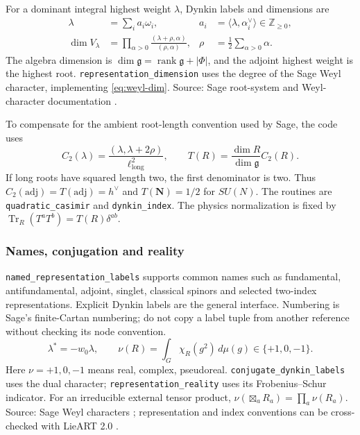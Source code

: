 \documentclass[11pt,a4paper]{article}
\numberwithin{equation}{section}
\newcommand{\code}[1]{{\small\nolinkurl{#1}}}
\newcommand{\Tr}{\operatorname{Tr}}
\newcommand{\rank}{\operatorname{rank}}
\newcommand{\adj}{\mathrm{adj}}
\newcommand{\ZZ}{\mathbb Z}
\newcommand{\src}[1]{{\small\color{muted}Source: #1.}\par}
\begin{document}
For a dominant integral highest weight $\lambda$, Dynkin labels and dimensions are
\begin{align}
 \lambda&=\sum_i a_i\omega_i,&
 a_i&=\langle\lambda,\alpha_i^\vee\rangle\in\ZZ_{\geq0},\label{eq:dynkin}\\
 \dim V_\lambda&=\prod_{\alpha>0}
 \frac{(\lambda+\rho,\alpha)}{(\rho,\alpha)},&
 \rho&=\frac12\sum_{\alpha>0}\alpha.\label{eq:weyl-dim}
\end{align}
The algebra dimension is $\dim\mathfrak g=\rank\mathfrak g+|\Phi|$, and the
adjoint highest weight is the highest root. \code{representation_dimension}
uses the degree of the Sage Weyl character, implementing \eqref{eq:weyl-dim}.
\src{Sage root-system and Weyl-character documentation \cite{sage-roots,sage-chars}}

To compensate for the ambient root-length convention used by Sage, the code uses
\begin{equation}
 C_2(\lambda)=\frac{(\lambda,\lambda+2\rho)}{\ell_{\mathrm{long}}^2},
 \qquad T(R)=\frac{\dim R}{\dim\mathfrak g}C_2(R).
 \label{eq:casimir}
\end{equation}
If long roots have squared length two, the first denominator is two. Thus
$C_2(\adj)=T(\adj)=h^\vee$ and $T(\mathbf N)=1/2$ for $SU(N)$.
The routines are \code{quadratic_casimir} and \code{dynkin_index}.
The physics normalization is fixed by
$\Tr_R(T^aT^b)=T(R)\delta^{ab}$.

\subsubsection{Names, conjugation and reality}
\code{named_representation_labels} supports common names such as fundamental,
antifundamental, adjoint, singlet, classical spinors and selected two-index
representations. Explicit Dynkin labels are the general interface. Numbering is
Sage's finite-Cartan numbering; do not copy a label tuple from another reference
without checking its node convention.
\begin{equation}
 \lambda^*=-w_0\lambda,\qquad
 \nu(R)=\int_G\chi_R(g^2)\,d\mu(g)\in\{+1,0,-1\}.
 \label{eq:reality}
\end{equation}
Here $\nu=+1,0,-1$ means real, complex, pseudoreal.
\code{conjugate_dynkin_labels} uses the dual character;
\code{representation_reality} uses its Frobenius--Schur indicator.
For an irreducible external tensor product, $\nu(\boxtimes_aR_a)=\prod_a\nu(R_a)$.
\src{Sage Weyl characters \cite{sage-chars}; representation and index conventions
can be cross-checked with LieART 2.0 \cite{lieart}}
\end{document}
